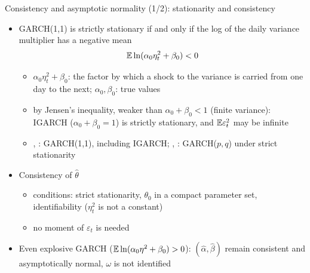 \begin{frame}{Consistency and asymptotic normality (1/2): stationarity and consistency}
\itemsize{\small}
\begin{itemize}
    \item GARCH(1,1) is strictly stationary if and only if the log of the daily variance multiplier has a negative mean
    \[ \mathbb{E}\ln(\alpha_0\eta_t^2 + \beta_0) < 0 \]
    \begin{itemize}
        \item $\alpha_0\eta_t^2 + \beta_0$: the factor by which a shock to the variance is carried from one day to the next; $\alpha_0, \beta_0$: true values
        \item by Jensen's inequality, weaker than $\alpha_0 + \beta_0 < 1$ (finite variance): IGARCH ($\alpha_0 + \beta_0 = 1$) is strictly stationary, and $\mathbb{E}\varepsilon_t^2$ may be infinite
        \item {}, : GARCH(1,1), including IGARCH; , : GARCH($p,q$) under strict stationarity
    \end{itemize}
    \item Consistency of $\hat\theta$ 
    \begin{itemize}
        \item conditions: strict stationarity, $\theta_0$ in a compact parameter set, identifiability ($\eta_t^2$ is not a constant)
        \item no moment of $\varepsilon_t$ is needed
    \end{itemize}
    \item Even explosive GARCH ($\mathbb{E}\ln(\alpha_0\eta^2 + \beta_0) > 0$): $(\hat\alpha, \hat\beta)$ remain consistent and asymptotically normal, $\omega$ is not identified 
\end{itemize}
\end{frame}

